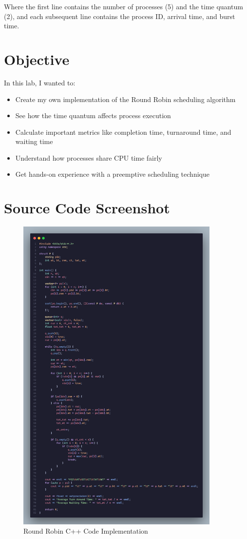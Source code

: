 \documentclass[12pt,a4paper]{article}
\begin{document}
Where the first line contains the number of processes (5) and the time quantum (2), and each subsequent line contains the process ID, arrival time, and burst time.

\section{Objective}
In this lab, I wanted to:
\begin{itemize}
    \item Create my own implementation of the Round Robin scheduling algorithm
    \item See how the time quantum affects process execution
    \item Calculate important metrics like completion time, turnaround time, and waiting time
    \item Understand how processes share CPU time fairly
    \item Get hands-on experience with a preemptive scheduling technique
\end{itemize}

\section{Source Code Screenshot}
\begin{figure}[H]
    \centering
    \includegraphics[width=0.9\textwidth]{code.png}
    \caption{Round Robin C++ Code Implementation}
    \label{fig:code}
\end{figure}
\end{document}
